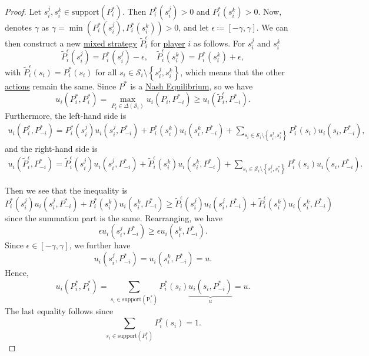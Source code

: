 \begin{proof}
	Let \(s_{i}^j, s_{i}^k\in \mathrm{support}(P_i^{\ast}) \). Then \(P_i^{\ast}(s_{i}^j)>0\) and \(P_i^{\ast}(s_{i}^k)>0\). Now, denotes \(\gamma\) as \(\gamma = \min\left(P_i^{\ast}(s_{i}^j), P_i^{\ast}(s_{i}^k)\right)>0\), and let \(\epsilon\coloneqq \left[-\gamma, \gamma\right]\). We can then construct a new \hyperref[def:mixed-strategy]{mixed strategy} \(\widetilde{P}_{i}^{\epsilon}\) for \hyperref[def:player]{player} \(i\) as follows. For \(s_{i}^j\) and \(s_{i}^k\)
	\[
		\widetilde{P}_{i}^{\epsilon}(s_{i}^j) = P_i^{\ast}(s_{i}^j)- \epsilon,\quad\widetilde{P}_{i}^{\epsilon}(s_{i}^k) = P_i^{\ast}(s_{i}^k)+\epsilon,
	\]
	with \(\widetilde{P}_{i}^{\epsilon}(s_{i}) = P_i^{\ast}(s_{i})\) for all \(s_{i}\in \mathcal{S}_{i}\setminus\left\{s_{i}^j, s_{i}^k\right\}\), which means that the other \hyperref[def:strategy]{actions} remain the same. Since \(P^{\ast}\) is a \hyperref[def:Nash-equilibrium]{Nash Equilibrium}, so we have
	\[
		u_{i}\left(P^{\ast}_i, P_{i}^{\ast}\right) = \max_{P_{i}\in \Delta(\mathcal{S}_{i})} u_{i}(P_{i}, P_{-i}^{\ast}) \geq u_{i}(\widetilde{P}_{i}^{\epsilon}, P_{-i}^{\ast}).
	\]
	Furthermore, the left-hand side is
	\[
		\begin{split}
			u_{i}\left(P^{\ast}_i, P_{-i}^{\ast}\right) = P_{i}^{\ast}(s_{i}^j)u_{i}(s_{i}^j, P^{\ast}_{-i}) + P^{\ast}_{i}(s_{i}^{k})u_{i}(s_{i}^{k}, P^{\ast}_{-i})
			+ \sum\limits_{ s_{i}\in \mathcal{S}_{i}\setminus\left\{s_{i}^j, s_{i}^*\right\}} P^{\ast}_{i}(s_{i})u_{i}(s_{i}, P^{\ast}_{-i}),
		\end{split}
	\]
	and the right-hand side is
	\[
		\begin{split}
			u_{i}\left(\widetilde{P}^{\epsilon}_i, P_{-i}^{\ast}\right) = \widetilde{P}_{i}^{\epsilon}(s_{i}^j)u_{i}(s_{i}^j, P^{\ast}_{-i}) + \widetilde{P}^{\epsilon}_{i}(s_{i}^{k})u_{i}(s_{i}^{k}, P^{\ast}_{-i})
			+ \sum\limits_{ s_{i}\in \mathcal{S}_{i}\setminus\left\{s_{i}^j, s_{i}^*\right\}} P^{\ast}_{i}(s_{i})u_{i}(s_{i}, P^{\ast}_{-i}).
		\end{split}
	\]

	Then we see that the inequality is
	\[
		P_{i}^{\ast}(s_{i}^j)u_{i}(s_{i}^j, P_{-i}^{\ast})+ P_{i}^{\ast}(s_{i}^k)u_{i}(s_{i}^k, P_{-i}^{\ast})\geq \widetilde{P}_{i}^{\epsilon}(s_{i}^j)u_{i}(s_{i}^j, P^{\ast}_{-i})+\widetilde{P}_{i}^{\epsilon}(s_{i}^k)u_{i}(s_{i}^k, P^{\ast}_{-i})
	\]
	since the summation part is the same. Rearranging, we have
	\[
		\epsilon u_{i}(s_{i}^j, P^{\ast}_{-i})\geq \epsilon u_{i}(s_{i}^k, P^{\ast}_{-i}).
	\]
	Since \(\epsilon\in\left[-\gamma, \gamma\right]\), we further have
	\[
		u_{i}(s_{i}^j, P^{\ast}_{-i}) = u_{i}(s_{i}^k, P^{\ast}_{-i}) = u.
	\]
	Hence,
	\[
		u_{i}(P^{\ast}_{i}, P^{\ast}_{i}) = \sum\limits_{s_{i}\in \mathrm{\text{support}(P^{\ast}_{i})} }P^{\ast}_{i}(s_{i})\underbrace{u_{i}(s_{i}, P^{\ast}_{-i})}_{u} = u.
	\]
	The last equality follows since
	\[
		\sum\limits_{s_{i}\in \mathrm{support}(P^{\ast}_i) } P_{i}^{\ast}(s_{i}) = 1.
	\]
\end{proof}

